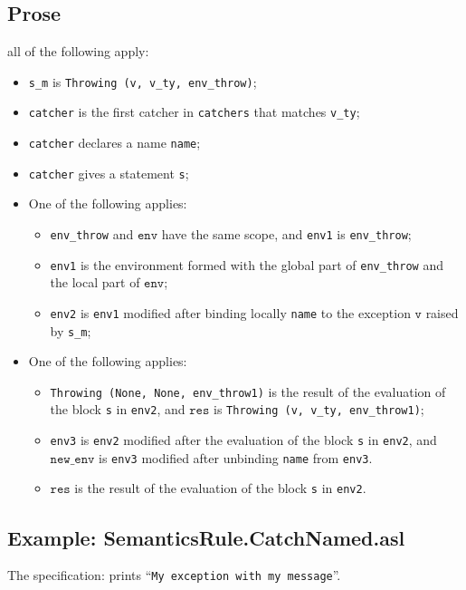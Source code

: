 \documentclass{book}
\newcommand\newenv[0]{\texttt{new\_env}}
\newcommand\env[0]{\texttt{env}}
\newcommand\vv[0]{\texttt{v}}
\newcommand\vres[0]{\texttt{res}}
\begin{document}
    \subsection{Prose}
    all of the following apply:
    \begin{itemize}
    \item \texttt{s\_m} is \texttt{Throwing (v, v\_ty, env\_throw)};
    \item \texttt{catcher} is the first catcher in \texttt{catchers} that matches \texttt{v\_ty};
    \item \texttt{catcher} declares a name \texttt{name};
    \item \texttt{catcher} gives a statement \texttt{s};
    \item One of the following applies:
      \begin{itemize}
      \item \texttt{env\_throw} and $\env$ have the same scope, and \texttt{env1} is \texttt{env\_throw};
      \item \texttt{env1} is the environment formed with the global part of \texttt{env\_throw}
        and the local part of $\env$;
      \item \texttt{env2} is \texttt{env1} modified after binding locally \texttt{name} to the exception
        $\vv$ raised by \texttt{s\_m};
      \end{itemize}
    \item One of the following applies:
      \begin{itemize}
      \item \texttt{Throwing (None, None, env\_throw1)} is the result of the evaluation of
        the block \texttt{s} in \texttt{env2}, and $\vres$ is \texttt{Throwing (v, v\_ty, env\_throw1)};
      \item \texttt{env3} is \texttt{env2} modified after the evaluation of the block \texttt{s} in
        \texttt{env2}, and $\newenv$ is \texttt{env3} modified after unbinding \texttt{name} from
        \texttt{env3}.
      \item $\vres$ is the result of the evaluation of the block \texttt{s} in \texttt{env2}.
      \end{itemize}
    \end{itemize}

    \subsection{Example: SemanticsRule.CatchNamed.asl}
    The specification:
    prints ``\texttt{My exception with my message}''.
\end{document}
